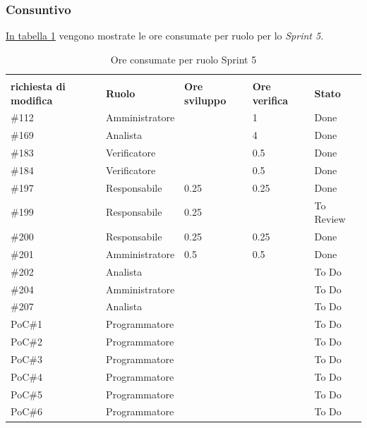 \subsubsection{Consuntivo}
\label{sec:sprint5_consuntivo}
\hyperref[tab:sprint5_ore_consumate]{In tabella \ref{tab:sprint5_ore_consumate}} vengono mostrate le ore consumate per ruolo per lo \textit{Sprint 5}.

\begin{table}[H]
    \centering
    \begin{tabular}{| l | l | l | l | l |}
        \hline
            \makecell{\textbf{Identificativo} \\ \textbf{richiesta di modifica}} &
            \textbf{Ruolo} & 
            \textbf{Ore sviluppo} &
            \textbf{Ore verifica} & 
            \textbf{Stato}\\ 
        \hline        
        \#112 & Amministratore &  & 1 & Done\\
        \hline        
        \#169 & Analista &  & 4 & Done\\
        \hline        
        \#183 & Verificatore &  & 0.5 & Done\\
        \hline        
        \#184 & Verificatore &  & 0.5 & Done\\
        \hline        
        \#197 & Responsabile & 0.25 & 0.25 & Done\\
        \hline
        \#199 & Responsabile & 0.25 & & To Review\\
        \hline
        \#200 & Responsabile & 0.25 & 0.25 & Done\\
        \hline
        \#201 & Amministratore & 0.5 & 0.5 & Done\\
        \hline
        \#202 & Analista &  &  & To Do\\
        \hline
        \#204 & Amministratore & & & To Do\\
        \hline
        \#207 & Analista &  &  & To Do\\
        \hline
        PoC\#1 & Programmatore & & & To Do\\
        \hline
        PoC\#2 & Programmatore & & & To Do\\
        \hline
        PoC\#3 & Programmatore & & & To Do\\
        \hline
        PoC\#4 & Programmatore & & & To Do\\
        \hline
        PoC\#5 & Programmatore & & & To Do\\
        \hline
        PoC\#6 & Programmatore & & & To Do\\
        \hline
    \end{tabular}
    \caption{Ore consumate per ruolo Sprint 5}
    \label{tab:sprint5_ore_consumate} 
\end{table}